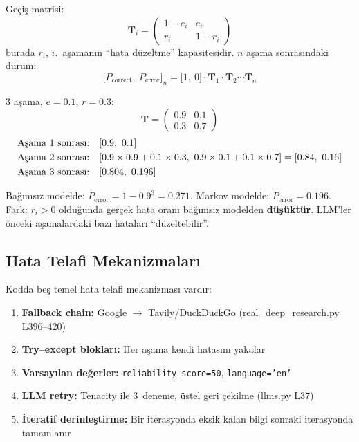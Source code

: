 Ge\c{c}i\c{s} matrisi:
\begin{equation}
\label{eq:markov_transition}
\mathbf{T}_i = \begin{pmatrix} 1 - e_i & e_i \\ r_i & 1 - r_i \end{pmatrix}
\end{equation}
burada $r_i$, $i$.~a\c{s}aman{\i}n ``hata d\"{u}zeltme'' kapasitesidir. $n$ a\c{s}ama sonras{\i}ndaki durum:
\begin{equation}
\label{eq:markov_state}
\bigl[P_{\text{correct}},\ P_{\text{error}}\bigr]_n = \bigl[1,\ 0\bigr] \cdot \mathbf{T}_1 \cdot \mathbf{T}_2 \cdots \mathbf{T}_n
\end{equation}

\begin{ornek}
3 a\c{s}ama, $e = 0.1$, $r = 0.3$:
\[
\mathbf{T} = \begin{pmatrix} 0.9 & 0.1 \\ 0.3 & 0.7 \end{pmatrix}
\]
\begin{align*}
\text{A\c{s}ama 1 sonras{\i}:}\quad &[0.9,\ 0.1] \\
\text{A\c{s}ama 2 sonras{\i}:}\quad &[0.9 \times 0.9 + 0.1 \times 0.3,\ 0.9 \times 0.1 + 0.1 \times 0.7] = [0.84,\ 0.16] \\
\text{A\c{s}ama 3 sonras{\i}:}\quad &[0.804,\ 0.196]
\end{align*}

Ba\u{g}{\i}ms{\i}z modelde: $P_{\text{error}} = 1 - 0.9^3 = 0.271$. Markov modelde: $P_{\text{error}} = 0.196$. Fark: $r_i > 0$ oldu\u{g}unda ger\c{c}ek hata oran{\i} ba\u{g}{\i}ms{\i}z modelden \textbf{d\"{u}\c{s}\"{u}kt\"{u}r}. LLM'ler \"{o}nceki a\c{s}amalardaki baz{\i} hatalar{\i} ``d\"{u}zeltebilir''.
\end{ornek}

\subsection{Hata Telafi Mekanizmalar{\i}}

Kodda be\c{s} temel hata telafi mekanizmas{\i} vard{\i}r:

\begin{enumerate}
  \item \textbf{Fallback chain:} Google $\to$ Tavily/DuckDuckGo (real\_deep\_research.py L396--420)
  \item \textbf{Try--except bloklar{\i}:} Her a\c{s}ama kendi hatas{\i}n{\i} yakalar
  \item \textbf{Varsay{\i}lan de\u{g}erler:} \texttt{reliability\_score=50}, \texttt{language='en'}
  \item \textbf{LLM retry:} Tenacity ile 3~deneme, \"{u}stel geri \c{c}ekilme (llms.py L37)
  \item \textbf{\.{I}teratif derinle\c{s}tirme:} Bir iterasyonda eksik kalan bilgi sonraki iterasyonda tamamlan{\i}r
\end{enumerate}


